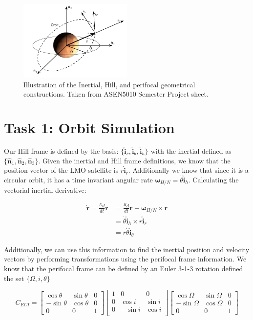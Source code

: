 \documentclass[paper]{aiaaNew}
\begin{document}
\begin{figure}[!htbp] 
  \centering
  \includegraphics[width=0.5\textwidth]{Figures/framedef.PNG}
  \caption{Illustration of the Inertial, Hill, and perifocal geometrical constructions. Taken from ASEN5010 Semester Project sheet.}
  \label{fig:succ}
 \end{figure}



\section*{Task 1: Orbit Simulation}
Our Hill frame is defined by the basis: $\{\bm{\hat{i}}_r, \bm{\hat{i}}_\theta, \bm{\hat{i}}_h \}$ with the inertial defined as $\{\bm{\hat{n}}_1, \bm{\hat{n}}_2, \bm{\hat{n}}_3 \}$. Given the inertial and Hill frame definitions, we know that the position vector of the LMO satellite is $r\bm{\hat{i}}_r$. Additionally we know that since it is a circular orbit, it has a time invariant angular rate ${\bm{\omega}}_{H/N} = \dot{\theta}\mathbf{\hat{i}}_h$. Calculating the vectorial inertial derivative:

\begin{align}
	\dot{\bm{r}} = \frac{^N d}{dt}\bm{r} &= \frac{^H d}{dt}\bm{r} + \bm{\omega}_{H/N} \times \bm{r} \\
	&= \dot{\theta}\bm{\hat{i}}_h \times r\bm{\hat{i}}_r \\
	&= r\dot{\theta} \bm{\hat{i}}_\theta
\end{align}

Additionally, we can use this information to find the inertial position and velocity vectors by performing transformations using the perifocal frame information. We know that the perifocal frame can be defined by an Euler 3-1-3 rotation defined the set $\{\Omega, i, \theta \}$

\begin{equation}
C_{ECI} = 
\begin{bmatrix}
\cos{\theta} & \sin{\theta} & 0 \\
-\sin{\theta} & \cos{\theta} & 0 \\
0 & 0 & 1 
\end{bmatrix}
\begin{bmatrix}
1 & 0 & 0 \\
0 & \cos{i} & \sin{i} \\
0 & -\sin{i} & \cos{i} \\
\end{bmatrix}
\begin{bmatrix}
\cos{\Omega} & \sin{\Omega} & 0 \\
-\sin{\Omega} & \cos{\Omega} & 0 \\
0 & 0 & 1 
\end{bmatrix}
\end{equation}
\end{document}
